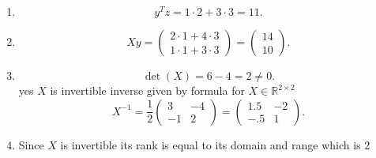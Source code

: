 \documentclass[11pt]{article}
\newcommand{\solution}[1]{{{\color{blue}{\bf Solution:} {#1}}}}
\begin{document}
\solution{
   \begin{enumerate}
       \item
           \[
           y^{T}z = 1\cdot 2 + 3 \cdot 3 = 11
           .\] 
       \item
           \[
           Xy = \begin{pmatrix} 2 \cdot 1 + 4 \cdot 3 \\ 1 \cdot 1 + 3 \cdot 3 \end{pmatrix}  = \begin{pmatrix} 14 \\ 10 \end{pmatrix} 
           .\] 
       \item 
           \[
           \det(X) = 6 -4 = 2 \ne 0
           .\] 
           yes $X$ is invertible inverse given by formula for $X \in \mathbb{R}^{2 \times 2}$
           \[
               X^{-1} = \frac{1}{2}\begin{pmatrix} 3 & -4 \\ -1 & 2 \end{pmatrix}  = \begin{pmatrix} 1.5 & -2 \\ -.5 & 1 \end{pmatrix} 
           .\] 
       \item Since $X$ is invertible its rank is equal to its domain and range which is 2
   \end{enumerate} 
}
\end{document}
